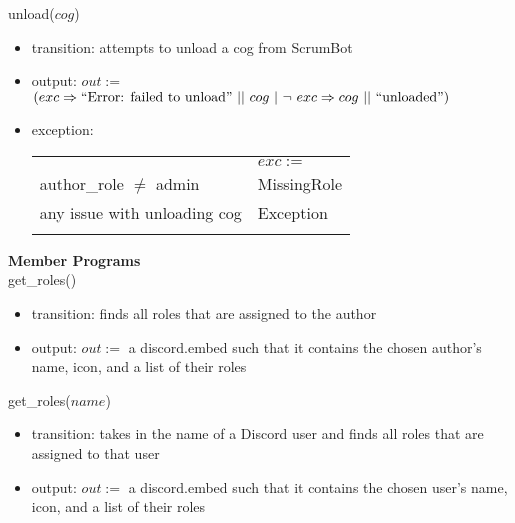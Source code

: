 \documentclass[12pt, titlepage]{article}
\begin{document}
\noindent unload($cog$)
\begin{itemize}
    \item transition: attempts to unload a cog from ScrumBot
    
    \item output: $out :=$ $(exc \Rightarrow ``\text{Error: failed to unload}"\ ||\ cog\ |\ \lnot\ exc \Rightarrow cog\ ||\ ``\text{unloaded}")$
    
    \item exception:\\
    \begin{tabular}{|p{12cm}|l|}
        \hhline{~|-|}
        \multicolumn{1}{r|}{} & \multicolumn{1}{l|}{$exc :=$}\\
        \hhline{|-|-|}
        author\_role $\neq$ admin & MissingRole\\
        \hhline{|-|-|}
        any issue with unloading cog & Exception\\
        \hhline{|-|-|}
    \end{tabular}
\end{itemize}

\noindent \textbf{Member Programs\\}
\noindent get\_roles()
\begin{itemize}
    \item transition: finds all roles that are assigned to the author
    \item output: $out :=$ a discord.embed such that it contains the chosen author's name, icon, and a list of their roles
\end{itemize}

\noindent get\_roles($name$)
\begin{itemize}
    \item transition: takes in the name of a Discord user and finds all roles that are assigned to that user
    \item output: $out :=$ a discord.embed such that it contains the chosen user's name, icon, and a list of their roles
\end{itemize}
\end{document}
